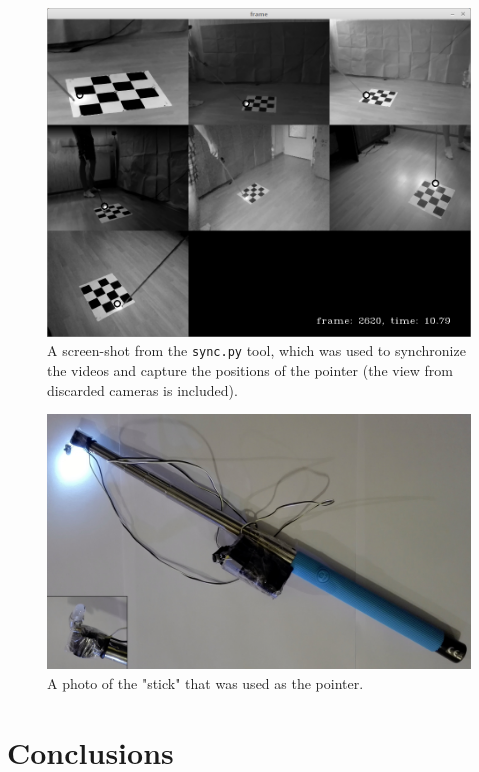 \documentclass[12pt]{article}
\begin{document}
\begin{figure}[ht]
\centering
\includegraphics[scale=0.4]{sync.png}
\caption{A screen-shot from the \texttt{sync.py} tool, which was used to synchronize the videos and capture the positions of the pointer (the view from discarded cameras is included).}
\end{figure}

\begin{figure}[ht]
\centering
\includegraphics[scale=0.097]{stick.jpg}
\caption{A photo of the "stick" that was used as the pointer.}
\end{figure}

\section{Conclusions}
\end{document}
